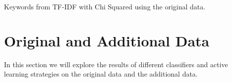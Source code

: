 \begin{table}[!ht]
\centering
\caption{Keywords from TF-IDF with Chi Squared using the original data.}

\label{tab:best_errors}
\end{table}


\section{Original and Additional Data}

In this section we will explore the results of different classifiers and active learning strategies on the original data and the additional data.